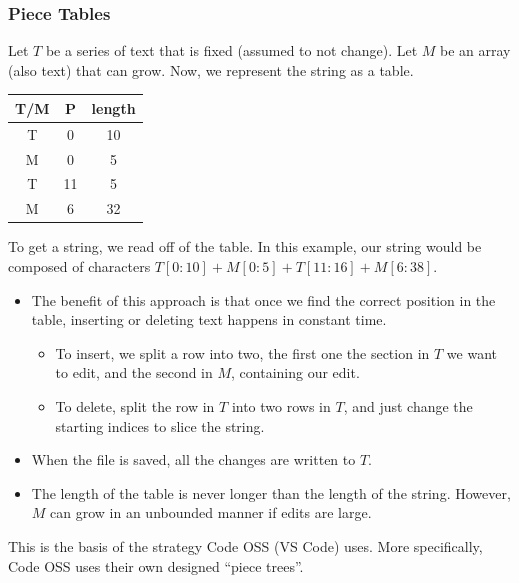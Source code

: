 \documentclass[10pt]{article}
\begin{document}
\subsubsection*{Piece Tables}
Let $T$ be a series of text that is fixed (assumed to not change).  Let $M$ be an array (also text) that can grow.  Now, we represent the string as a table.
\begin{center}
\begin{tabular}{|c|c|c|}
    \hline
    T/M & P & length \\ \hline
    T & 0 & 10 \\
    M & 0 & 5 \\
    T & 11 & 5 \\
    M & 6 & 32 \\ \hline
\end{tabular}
\end{center}
To get a string, we read off of the table.  In this example, our string would be composed of characters $T[0:10] + M[0:5] + T[11:16] + M[6:38]$.
\begin{itemize}
    \item The benefit of this approach is that once we find the correct position in the table, inserting or deleting text happens in constant time.
    \begin{itemize}
        \item To insert, we split a row into two, the first one the section in $T$ we want to edit, and the second in $M$, containing our edit.
        \item To delete, split the row in $T$ into two rows in $T$, and just change the starting indices to slice the string.
    \end{itemize}
    \item When the file is saved, all the changes are written to $T$.
    \item The length of the table is never longer than the length of the string.  However, $M$ can grow in an unbounded manner if edits are large.
\end{itemize}
This is the basis of the strategy Code OSS (VS Code) uses.  More specifically, Code OSS uses their own designed ``piece trees''.
\end{document}
